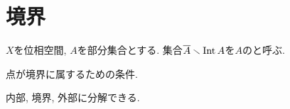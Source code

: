 \documentclass[uplatex, dvipdfmx, a4paper, 12pt, class=jsbook, crop=false]{standalone}
\begin{document}
\section{境界}
\label{sec:boundaries}

\begin{definition}
	$ X $を位相空間, $ A $を部分集合とする. 集合$ \overline{A} \smallsetminus \mathop{\mathrm{Int}}\nolimits A $を$ A $のと呼ぶ.
\end{definition}

\begin{proposition}
	点が境界に属するための条件.
\end{proposition}

\begin{proposition}
	内部, 境界, 外部に分解できる.
\end{proposition}
\end{document}
